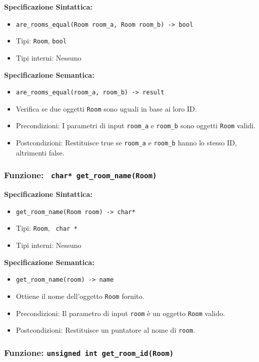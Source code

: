 \documentclass[11pt]{scrartcl} %
\begin{document}
\textbf{Specificazione Sintattica:}
\begin{itemize}
	\item \texttt{are\_rooms\_equal(Room room\_a, Room room\_b) -> bool}
	\item Tipi: \texttt{Room}, \texttt{bool}
	\item Tipi interni: Nessuno
\end{itemize}

\textbf{Specificazione Semantica:}
\begin{itemize}
	\item \texttt{are\_rooms\_equal(room\_a, room\_b) -> result}
	\item Verifica se due oggetti \texttt{Room} sono uguali in base ai loro ID.
	\item Precondizioni: I parametri di input \texttt{room\_a} e \texttt{room\_b} sono oggetti \texttt{Room} validi.
	\item Postcondizioni: Restituisce true se \texttt{room\_a} e \texttt{room\_b} hanno lo stesso ID, altrimenti false.
\end{itemize}

\subsubsection{Funzione: \texttt{ char* get\_room\_name(Room)}}

\textbf{Specificazione Sintattica:}
\begin{itemize}
	\item \texttt{get\_room\_name(Room room) ->  char*}
	\item Tipi: \texttt{Room}, \texttt{ char *}
	\item Tipi interni: Nessuno
\end{itemize}

\textbf{Specificazione Semantica:}
\begin{itemize}
	\item \texttt{get\_room\_name(room) -> name}
	\item Ottiene il nome dell'oggetto \texttt{Room} fornito.
	\item Precondizioni: Il parametro di input \texttt{room} è un oggetto \texttt{Room} valido.
	\item Postcondizioni: Restituisce un puntatore al nome di \texttt{room}.
\end{itemize}

\subsubsection{Funzione: \texttt{unsigned int get\_room\_id(Room)}}
\end{document}
